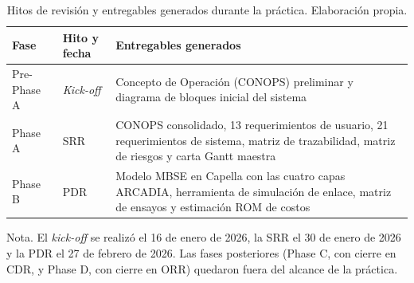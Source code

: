 %



\begin{table}[H]
\centering
\begin{threeparttable}
\caption{Hitos de revisión y entregables generados durante la práctica.
Elaboración propia.\vspace{1ex}}
\small
\begin{tabularx}{\textwidth}{@{}l l X@{}}
\toprule
\textbf{Fase} & \textbf{Hito y fecha} & \textbf{Entregables generados} \\
\midrule
Pre-Phase A & \textit{Kick-off} & Concepto de Operación (CONOPS) preliminar y
diagrama de bloques inicial del sistema \\
\addlinespace
Phase A & SRR & CONOPS consolidado, 13 requerimientos de usuario, 21
requerimientos de sistema, matriz de trazabilidad, matriz de riesgos y carta
Gantt maestra \\
\addlinespace
Phase B & PDR & Modelo MBSE en Capella con las cuatro capas ARCADIA, herramienta
de simulación de enlace, matriz de ensayos y estimación ROM de costos \\
\bottomrule
\end{tabularx}
\begin{tablenotes}[flushleft]\footnotesize
\item Nota. El \textit{kick-off} se realizó el 16 de enero de 2026, la SRR el 30
de enero de 2026 y la PDR el 27 de febrero de 2026. Las fases posteriores
(Phase C, con cierre en CDR, y Phase D, con cierre en ORR) quedaron fuera del
alcance de la práctica.
\end{tablenotes}
\end{threeparttable}
\end{table}


